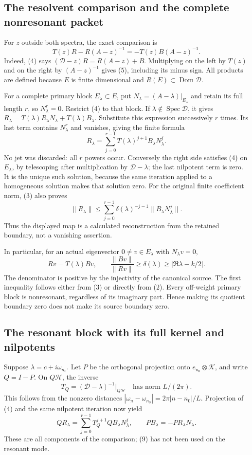 \subsection{The resolvent comparison and the complete nonresonant packet}
For \(z\) outside both spectra, the exact comparison is
\[
 T(z)R-R(A-z)^{-1}=-T(z)B(A-z)^{-1}.
 \tag{5}
\]
Indeed, (4) says
\((\mathscr D-z)R=R(A-z)+B\). Multiplying on the left by
\(T(z)\) and on the right by \((A-z)^{-1}\) gives (5), including
its minus sign. All products are defined because \(E\) is finite
dimensional and \(R(E)\subset\operatorname{Dom}\mathscr D\).

For a complete primary block \(E_\lambda\subset E\), put
\(N_\lambda=(A-\lambda)|_{E_\lambda}\) and retain its full
length \(r\), so \(N_\lambda^r=0\). Restrict (4) to that block.
If \(\lambda\notin\operatorname{Spec}\mathscr D\), it gives
\(R_\lambda=T(\lambda)R_\lambda N_\lambda+T(\lambda)B_\lambda\).
Substitute this expression successively \(r\) times. Its last
term contains \(N_\lambda^r\) and vanishes, giving the finite formula
\[
 \boxed{R_\lambda=
 \sum_{j=0}^{r-1}T(\lambda)^{j+1}B_\lambda N_\lambda^j.}
 \tag{6}
\]
No jet was discarded: all \(r\) powers occur. Conversely the right
side satisfies (4) on \(E_\lambda\), by telescoping after
multiplication by \(\mathscr D-\lambda\); the last nilpotent term
is zero. It is the unique such solution, because the same iteration
applied to a homogeneous solution makes that solution zero.
For the original finite coefficient norm, (3) also proves
\[
 \|R_\lambda\|
 \le\sum_{j=0}^{r-1}\delta(\lambda)^{-j-1}
                     \|B_\lambda N_\lambda^j\|.
 \tag{7}
\]
Thus the displayed map is a calculated reconstruction from the
retained boundary, not a vanishing assertion.

In particular, for an actual eigenvector \(0\ne v\in E_\lambda\)
with \(N_\lambda v=0\),
\[
 Rv=T(\lambda)Bv,\qquad
 \frac{\|Bv\|}{\|Rv\|}\ge\delta(\lambda)
 \ge|\Re\lambda-k/2|.
 \tag{8}
\]
The denominator is positive by the injectivity of the canonical
source. The first inequality follows either from (3) or directly
from (2). Every off-weight primary block is nonresonant, regardless
of its imaginary part. Hence making its quotient boundary zero does
not make its source boundary zero.

\subsection{The resonant block with its full kernel and nilpotents}
Suppose \(\lambda=c+i\omega_{n_0}\). Let \(P\) be the orthogonal
projection onto \(e_{n_0}\otimes\mathcal K\), and write \(Q=I-P\).
On \(Q\mathscr H\), the inverse
\[
 T_Q=(\mathscr D-\lambda)^{-1}|_{Q\mathscr H}
 \quad\text{has norm }L/(2\pi).
 \tag{9}
\]
This follows from the nonzero distances
\(|\omega_n-\omega_{n_0}|=2\pi|n-n_0|/L\).
Projection of (4) and the same nilpotent iteration now yield
\[
 QR_\lambda=\sum_{j=0}^{r-1}T_Q^{j+1}QB_\lambda N_\lambda^j,
 \qquad
 PB_\lambda=-PR_\lambda N_\lambda.
 \tag{10}
\]
These are all components of the comparison; (9) has not been used
on the resonant mode.

